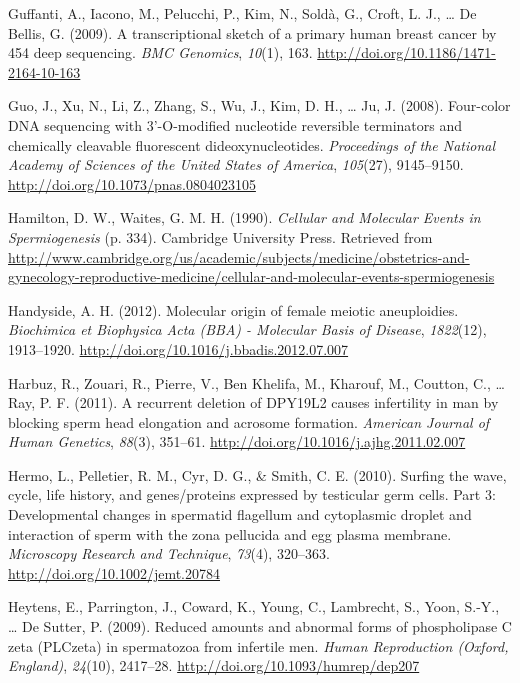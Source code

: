 \documentclass[12pt,twoside]{reedthesis}
\theoremstyle{definition}
\theoremstyle{definition}
\theoremstyle{remark}
\begin{document}
  \hypertarget{ref-Guffanti2009}{}
  Guffanti, A., Iacono, M., Pelucchi, P., Kim, N., Soldà, G., Croft, L.
  J., \ldots{} De Bellis, G. (2009). A transcriptional sketch of a primary
  human breast cancer by 454 deep sequencing. \emph{BMC Genomics},
  \emph{10}(1), 163. \url{http://doi.org/10.1186/1471-2164-10-163}
  
  \hypertarget{ref-Guo2008}{}
  Guo, J., Xu, N., Li, Z., Zhang, S., Wu, J., Kim, D. H., \ldots{} Ju, J.
  (2008). Four-color DNA sequencing with 3'-O-modified nucleotide
  reversible terminators and chemically cleavable fluorescent
  dideoxynucleotides. \emph{Proceedings of the National Academy of
  Sciences of the United States of America}, \emph{105}(27), 9145--9150.
  \url{http://doi.org/10.1073/pnas.0804023105}
  
  \hypertarget{ref-Hamilton1987}{}
  Hamilton, D. W., Waites, G. M. H. (1990). \emph{Cellular and Molecular
  Events in Spermiogenesis} (p. 334). Cambridge University Press.
  Retrieved from
  \url{http://www.cambridge.org/us/academic/subjects/medicine/obstetrics-and-gynecology-reproductive-medicine/cellular-and-molecular-events-spermiogenesis}
  
  \hypertarget{ref-Handyside2012}{}
  Handyside, A. H. (2012). Molecular origin of female meiotic
  aneuploidies. \emph{Biochimica et Biophysica Acta (BBA) - Molecular
  Basis of Disease}, \emph{1822}(12), 1913--1920.
  \url{http://doi.org/10.1016/j.bbadis.2012.07.007}
  
  \hypertarget{ref-Harbuz2011}{}
  Harbuz, R., Zouari, R., Pierre, V., Ben Khelifa, M., Kharouf, M.,
  Coutton, C., \ldots{} Ray, P. F. (2011). A recurrent deletion of DPY19L2
  causes infertility in man by blocking sperm head elongation and acrosome
  formation. \emph{American Journal of Human Genetics}, \emph{88}(3),
  351--61. \url{http://doi.org/10.1016/j.ajhg.2011.02.007}
  
  \hypertarget{ref-Hermo2010}{}
  Hermo, L., Pelletier, R. M., Cyr, D. G., \& Smith, C. E. (2010). Surfing
  the wave, cycle, life history, and genes/proteins expressed by
  testicular germ cells. Part 3: Developmental changes in spermatid
  flagellum and cytoplasmic droplet and interaction of sperm with the zona
  pellucida and egg plasma membrane. \emph{Microscopy Research and
  Technique}, \emph{73}(4), 320--363.
  \url{http://doi.org/10.1002/jemt.20784}
  
  \hypertarget{ref-Heytens2009}{}
  Heytens, E., Parrington, J., Coward, K., Young, C., Lambrecht, S., Yoon,
  S.-Y., \ldots{} De Sutter, P. (2009). Reduced amounts and abnormal forms
  of phospholipase C zeta (PLCzeta) in spermatozoa from infertile men.
  \emph{Human Reproduction (Oxford, England)}, \emph{24}(10), 2417--28.
  \url{http://doi.org/10.1093/humrep/dep207}
  
\end{document}
